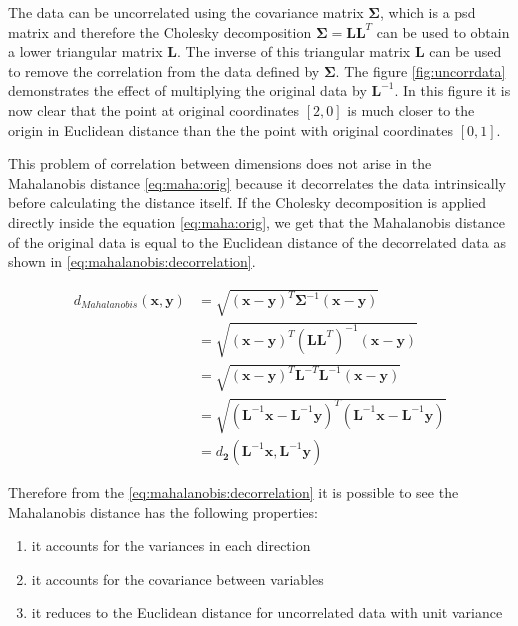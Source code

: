 \documentclass[12pt,a4paper]{report}
\begin{document}

The data can be uncorrelated using the covariance matrix $\bm{\Sigma}$, which is a \ac{psd} matrix and therefore the Cholesky decomposition $\bm{\Sigma}=\bm{L}\bm{L}^T$ can be used to obtain a lower triangular matrix $\bm{L}$. The inverse of this triangular matrix $\bm{L}$ can be used to remove the correlation from the data defined by $\bm{\Sigma}$. The figure \ref{fig:uncorrdata} demonstrates the effect of multiplying the original data by $\bm{L}^{-1}$. In this figure it is now clear that the point at original coordinates $[2,0]$ is much closer to the origin in Euclidean distance than the the point with original coordinates $[0,1]$.


This problem of correlation between dimensions does not arise in the Mahalanobis distance \eqref{eq:maha:orig} because it decorrelates the data intrinsically before calculating the distance itself. If the Cholesky decomposition is applied directly inside the equation \ref{eq:maha:orig}, we get that the Mahalanobis distance of the original data is equal to the Euclidean distance of the decorrelated data as shown in \ref{eq:mahalanobis:decorrelation}.

\begin{align}
  d_{Mahalanobis}(\textbf{x},\textbf{y}) &= \sqrt{(\textbf{x}-\textbf{y})^{T}\bm{\Sigma}^{-1}(\textbf{x}-\textbf{y})} \nonumber\\
         &= \sqrt{(\textbf{x}-\textbf{y})^{T}(\bm{L}\bm{L}^{T})^{-1}(\textbf{x}-\textbf{y})} \nonumber\\
         &= \sqrt{(\textbf{x}-\textbf{y})^{T}\bm{L}^{-T}\bm{L}^{-1}(\textbf{x}-\textbf{y})} \nonumber\\
         &= \sqrt{(\bm{L}^{-1}\textbf{x}-\bm{L}^{-1}\textbf{y})^{T}(\bm{L}^{-1}\textbf{x}-\bm{L}^{-1}\textbf{y})} \nonumber\\
         &= d_{\bm{2}}(\bm{L}^{-1}\textbf{x}, \bm{L}^{-1}\textbf{y}) \label{eq:mahalanobis:decorrelation}
\end{align}

Therefore from the \ref{eq:mahalanobis:decorrelation} it is possible to see the Mahalanobis distance has the following properties:
\begin{enumerate}
\item it accounts for the variances in each direction
\item it accounts for the covariance between variables
\item it reduces to the Euclidean distance for uncorrelated data with unit variance
\end{enumerate}
\end{document}
